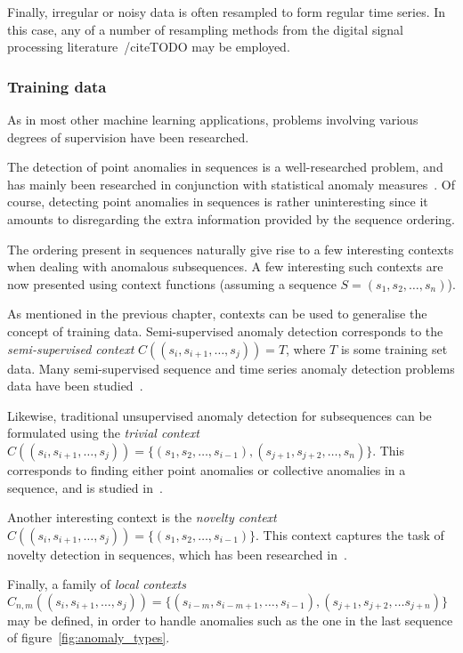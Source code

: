 Finally, irregular or noisy data is often resampled to form regular time series. In this case, any of a number of resampling methods from the digital signal processing literature~/cite{TODO} may be employed.

\subsubsection{Training data}

As in most other machine learning applications, problems involving various degrees of supervision have been researched.

The detection of point anomalies in sequences is a well-researched problem, and has mainly been researched in conjunction with statistical anomaly measures~\cite{TODO}. Of course, detecting point anomalies in sequences is rather uninteresting since it amounts to disregarding the extra information provided by the sequence ordering.

The ordering present in sequences naturally give rise to a few interesting contexts when dealing with anomalous subsequences. A few interesting such contexts are now presented using context functions (assuming a sequence $S = (s_1, s_2, \dots, s_n)$).

As mentioned in the previous chapter, contexts can be used to generalise the concept of training data. Semi-supervised anomaly detection corresponds to the \emph{semi-supervised context} $C((s_i, s_{i+1}, \dots, s_j)) = T$, where $T$ is some training set data. Many semi-supervised sequence and time series anomaly detection problems data have been studied~\cite{TODO}.

Likewise, traditional unsupervised anomaly detection for subsequences can be formulated using the \emph{trivial context} $C((s_i, s_{i+1}, \dots, s_j)) = \{ (s_1, s_2, \dots, s_{i-1}), (s_{j+1}, s_{j+2}, \dots, s_n) \}$. This corresponds to finding either point anomalies or collective anomalies in a sequence, and is studied in~\cite{TODO}.

Another interesting context is the \emph{novelty context} $C((s_i, s_{i+1}, \dots, s_j)) = \{(s_1, s_2, \dots, s_{i-1})\}$. This context captures the task of novelty detection in sequences, which has been researched in~\cite{TODO}.

Finally, a family of \emph{local contexts} $C_{n,m}((s_i, s_{i+1}, \dots, s_j)) = \{(s_{i-m}, s_{i-m+1}, \dots, s_{i-1}), (s_{j+1}, s_{j+2}, \ldots s_{j+n})\}$ may be defined, in order to handle anomalies such as the one in the last sequence of figure~\ref{fig:anomaly_types}.

